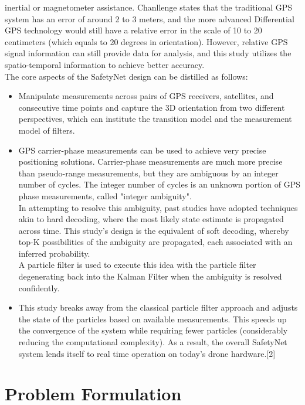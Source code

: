 \documentclass[journal,onecolumn]{IEEEtran}
\begin{document}
inertial or magnetometer assistance. Chanllenge states that the traditional GPS system has an error of around 2 to 3 meters, and
the more advanced Differential GPS technology would still have a relative error in the scale of 10 to 20 centimeters (which
equals to 20 degrees in orientation). However, relative GPS signal information can still provide data for analysis, and this study utilizes the
spatio-temporal information to achieve better accuracy.\\
The core aspects of the SafetyNet design can be distilled as follows:
\begin{itemize}
  \item Manipulate measurements across pairs of GPS receivers, satellites, and consecutive time points and capture the 3D orientation
from two different perspectives, which can institute the transition model and the measurement model of filters.
  \item GPS carrier-phase measurements can be used to achieve very precise positioning solutions. Carrier-phase measurements
are much more precise than pseudo-range measurements, but they are ambiguous by an integer number of cycles. The
integer number of cycles is an unknown portion of GPS phase measurements, called "integer ambiguity".\\
  In attempting to resolve this ambiguity, past studies have adopted techniques akin to hard decoding, where the most likely
state estimate is propagated across time. This study's design is the equivalent of soft decoding, whereby top-K possibilities
of the ambiguity are propagated, each associated with an inferred probability.\\
A particle filter is used to execute this idea with the particle filter degenerating back into the Kalman Filter when the ambiguity
is resolved confidently.

  \item This study breaks away from the classical particle filter approach and adjusts the state of the particles based on available
measurements. This speeds up the convergence of the system while requiring fewer particles (considerably reducing the
computational complexity). As a result, the overall SafetyNet system lends itself to real time operation on today's drone
hardware.[2]
\end{itemize}

\section{Problem Formulation}
\end{document}
